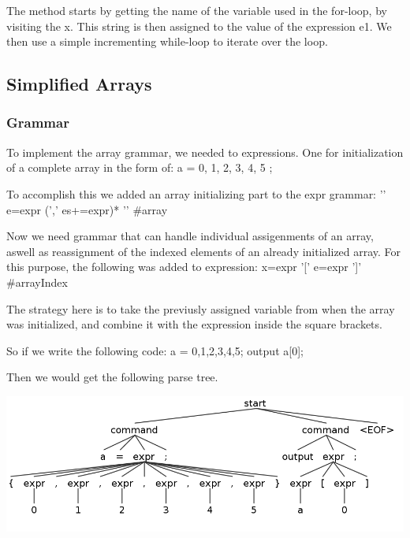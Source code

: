 \documentclass[a4paper]{article}
\newenvironment{code}%
   {\snugshade\verbatim}%
   {\endverbatim\endsnugshade}
\begin{document}
The method starts by getting the name of the variable used in the for-loop, by visiting the x. This string is then assigned to the
value of the expression e1. We then use a simple incrementing while-loop to iterate over the loop.
  
\subsection{Simplified Arrays}
  
\subsubsection{Grammar}
To implement the array grammar, we needed to expressions. One for initialization of a complete array in the form of:
\begin{code}
a = { 0, 1, 2, 3, 4, 5 };
\end{code}

To accomplish this we added an array initializing part to the expr grammar:
\begin{code}
'{' e=expr (',' es+=expr)* '}'		#array
\end{code}

Now we need grammar that can handle individual assigenments of an array, aswell as reassignment of the indexed elements of an already initialized array. For this purpose, the following was added to expression:
\begin{code}
x=expr '[' e=expr ']'			#arrayIndex
\end{code}

The strategy here is to take the previusly assigned variable from when the array was initialized, and combine it with the expression inside the square brackets. 

So if we write the following code:
\begin{code}
a = {0,1,2,3,4,5};
output a[0];
\end{code}


Then we would get the following parse tree.

\begin{center}
  \includegraphics[width=.8\textwidth]{task2-3.png}
\end{center}
\end{document}
